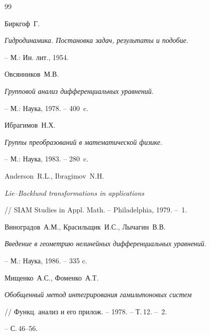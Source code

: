\begin{thebibliography}{99}







Биркгоф~Г.


{\em Гидродинамика. Постановка задач, результаты и подобие}.


-- М.: Ин. лит., 1954.







Овсянников~М.В.


{\em Групповой анализ дифференциальных уравнений}.


-- М.: Наука, 1978. -- 400~c.







Ибрагимов~Н.Х.


{\em Группы преобразований в математической физике}.


-- М.: Наука, 1983. -- 280~c.







Anderson~R.L., Ibragimov~N.H.


{\em Lie--Backlund transformations in applications}


// SIAM Studies in Appl. Math. -- Philadelphia, 1979. -- \No\,1.







Виноградов~А.М., Красильщик~И.С., Лычагин~В.В.


{\em Введение в геометрию нелинейных дифференциальных уравнений}.


-- М.: Наука, 1986. -- 335 c.







Мищенко~А.С., Фоменко~А.Т.


{\em Обобщенный метод интегрирования гамильтоновых систем}


// Функц. анализ и его прилож. -- 1978. -- Т.\,12. -- \No\,2.


-- С.\,46--56.






\end{thebibliography}
